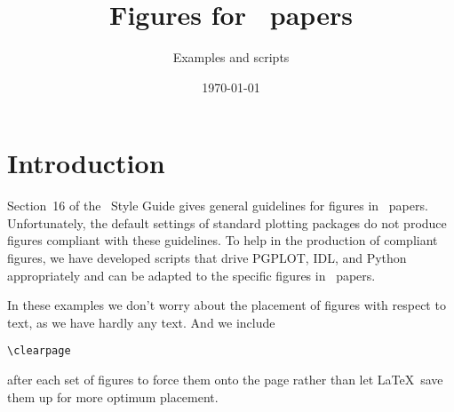 \documentclass[traditabstract]{aa}
\begin{document}
\title{Figures for \Planck\ papers}
\subtitle{Examples and scripts}


\date{\today}



\maketitle


\section{Introduction}
\label{sec:introduction}

Section~16 of the \Planck\ Style Guide gives general guidelines for figures in \Planck\ papers.  Unfortunately, the default settings of standard plotting packages do not produce figures compliant with these guidelines.  To help in the production of compliant figures, we have developed scripts that drive PGPLOT, IDL, and Python appropriately and can be adapted to the specific figures in \Planck\ papers. 

In these examples we don't worry about the placement of figures with respect to text, as we have hardly any text.  And we include \begin{verbatim}\clearpage\end{verbatim} after each set of figures to force them onto the page rather than let La\TeX\ save them up for more optimum placement. 

\def\fcaption{Comparison of the joint power spectrum estimates from the three CBI mosaics with the measurements
 from BOOMERANG, DASI, and MAXIMA. The rectangles indicate the 68\% confidence intervals on band-power; for BOOMERANG, the solid rectangles indicate the 68\% confidence interval for the statistical and sample variance errors, while the hatched rectangles shows the amount by which a $\pm1\sigma$ error in the beamwidth ($12\farcm9 \pm 1\farcm4$) would shift the estimates (all up or all down together). The {\it black curve} is the joint model (see text).}
\end{document}
